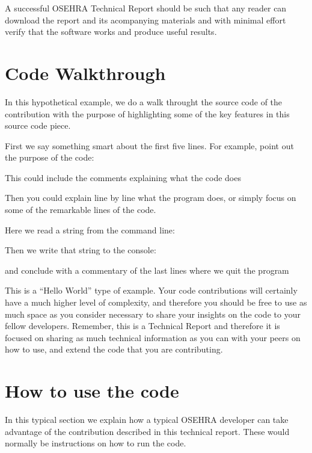 \documentclass{OSEHRAArticle}
\newcommand{\lstlistingwithnumber}[3]{
\begin{center}

\end{center}
}
\begin{document}
A successful OSEHRA Technical Report should be such that any reader can download
the report and its acompanying materials and with minimal effort verify that the
software works and produce useful results.

\section{Code Walkthrough}

In this hypothetical example, we do a walk throught the source code of the
contribution with the purpose of highlighting some of the key features in this
source code piece.

First we say something smart about the first five lines. For example, point out
the purpose of the code:

\lstlistingwithnumber{1}{2}{PROGRAM1.m}

This could include the comments explaining what the code does

\lstlistingwithnumber{4}{7}{PROGRAM1.m}

Then you could explain line by line what the program does, or simply focus on
some of the remarkable lines of the code.

Here we read a string from the command line:

\lstlistingwithnumber{8}{8}{PROGRAM1.m}

Then we write that string to the console:

\lstlistingwithnumber{9}{9}{PROGRAM1.m}

and conclude with a commentary of the last lines where we quit the program

\lstlistingwithnumber{10}{10}{PROGRAM1.m}


This is a ``Hello World'' type of example. Your code contributions will
certainly have a much higher level of complexity, and therefore you should be
free to use as much space as you consider necessary to share your insights on
the code to your fellow developers. Remember, this is a Technical Report and
therefore it is focused on sharing as much technical information as you can
with your peers on how to use, and extend the code that you are contributing.

\section{How to use the code}

In this typical section we explain how a typical OSEHRA developer can take
advantage of the contribution described in this technical report. These would
normally be instructions on how to run the code.
\end{document}

